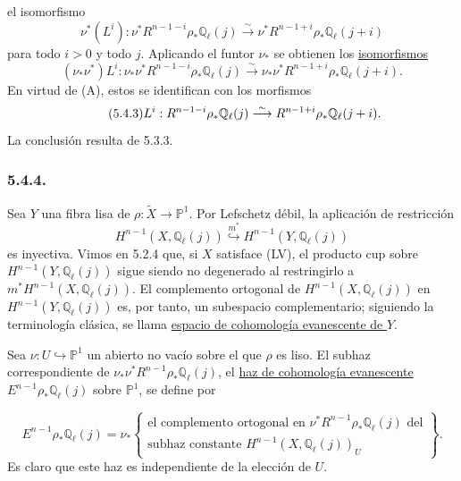 \pageoriginale

el isomorfismo
\begin{equation}\tag{5.4.1}
\nu^*(L^i):
\nu^*R^{n-1-i}\rho_*\mathbb Q_\ell(j)
\overset{\sim}{\longrightarrow}
\nu^*R^{n-1+i}\rho_*\mathbb Q_\ell(j+i)
\end{equation}
para todo $i>0$ y todo $j$. Aplicando el funtor $\nu_*$ se obtienen los
\underline{isomorfismos}
\begin{equation}\tag{5.4.2}
(\nu_*\nu^*)L^i:
\nu_*\nu^*R^{n-1-i}\rho_*\mathbb Q_\ell(j)
\overset{\sim}{\longrightarrow}
\nu_*\nu^*R^{n-1+i}\rho_*\mathbb Q_\ell(j+i).
\end{equation}
En virtud de (A), estos se identifican con los morfismos
\begin{equation}\tag{5.4.3}
L^i:R^{n-1-i}\sisi{\rho^*}{\rho_*}\mathbb Q_\ell(j)
\overset{\sim}{\longrightarrow}
R^{n-1+i}\rho_*\mathbb Q_\ell(j+i).
\end{equation}
La conclusión resulta de 5.3.3.

\subsubsection*{5.4.4.}
Sea $Y$ una fibra lisa de
$\rho:\widetilde X\to\mathbb P^1$. Por Lefschetz débil, la aplicación
de restricción
\[
H^{n-1}(X,\mathbb Q_\ell(j))
\overset{m^*}{\hookrightarrow}
H^{n-1}(Y,\mathbb Q_\ell(j))
\]
es inyectiva. Vimos en 5.2.4 que, si $X$ satisface (LV), el producto
cup sobre $H^{n-1}(Y,\mathbb Q_\ell(j))$ sigue siendo no degenerado al
restringirlo a $m^*H^{n-1}(X,\mathbb Q_\ell(j))$. El complemento
ortogonal de $H^{n-1}(X,\mathbb Q_\ell(j))$ en
$H^{n-1}(Y,\mathbb Q_\ell(j))$ es, por tanto, un subespacio
complementario; siguiendo la terminología clásica, se llama
\underline{espacio de cohomología evanescente de $Y$}.

Sea $\nu:U\hookrightarrow\mathbb P^1$ un abierto no vacío sobre el que
$\rho$ es liso. El subhaz correspondiente de
$\nu_*\nu^*R^{n-1}\rho_*\mathbb Q_\ell(j)$, el
\underline{haz de cohomología evanescente}
$E^{n-1}\rho_*\mathbb Q_\ell(j)$ sobre $\mathbb P^1$, se define por

\pageoriginale

\begin{equation}\tag{5.4.4.1}
E^{n-1}\rho_*\mathbb Q_\ell(j)
=\nu_*\left\{
\begin{array}{l}
\text{el complemento ortogonal en }
\nu^*R^{n-1}\rho_*\mathbb Q_\ell(j)\text{ del}\\[1ex]
\text{subhaz constante }H^{n-1}(X,\mathbb Q_\ell(j))_U
\end{array}
\right\}.
\end{equation}
Es claro que este haz es independiente de la elección de $U$.

